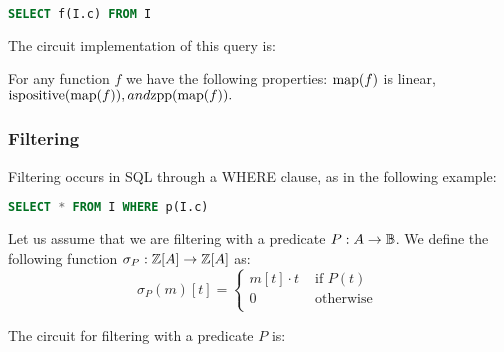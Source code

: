 \begin{lstlisting}[language=SQL]
SELECT f(I.c) FROM I
\end{lstlisting}

The circuit implementation of this query is:

\begin{center}
\end{center}

For any function $f$ we have the following properties:
$\mbox{map}(f)$ is linear, $\mbox{ispositive}(\mbox{map}(f)), and \mbox{zpp}(\mbox{map}(f)).$

\subsubsection{Filtering}

Filtering occurs in SQL through a WHERE clause, as in the following example:

\noindent
\begin{lstlisting}[language=SQL]
SELECT * FROM I WHERE p(I.c)
\end{lstlisting}

Let us assume that we are filtering with a predicate 
$P: A \rightarrow \mathbb{B}$.  We define the following function $\sigma_P: \mathbb{Z}[A] \rightarrow \mathbb{Z}[A]$ as:
$$\sigma_P(m)[t] = \left\{
\begin{array}{ll}
  m[t] \cdot t & \mbox{ if } P(t) \\
  0 & \mbox{ otherwise } \\
\end{array}
\right.
$$

The circuit for filtering with a predicate $P$ is:

\begin{center}
\end{center}

